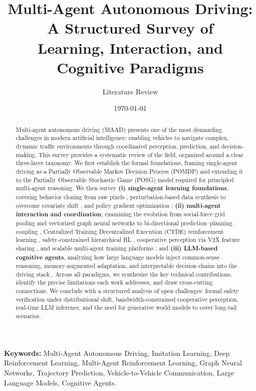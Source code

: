 \documentclass[12pt, a4paper]{article}
\title{\textbf{Multi-Agent Autonomous Driving: A Structured Survey of\\
Learning, Interaction, and Cognitive Paradigms}}
\author{\large Literature Review}
\date{\today}
\begin{document}
\maketitle

\begin{abstract}
Multi-agent autonomous driving (MAAD) presents one of the most demanding
challenges in modern artificial intelligence: enabling vehicles to navigate complex,
dynamic traffic environments through coordinated perception, prediction, and
decision-making. This survey provides a systematic review of the field, organized
around a clear three-layer taxonomy. We first establish the formal foundations,
framing single-agent driving as a Partially Observable Markov Decision Process
(POMDP) and extending it to the Partially Observable Stochastic Game (POSG)
model required for principled multi-agent reasoning. We then survey
\textbf{(i) single-agent learning foundations}, covering behavior cloning from raw
pixels \citep{bojarski2016end}, perturbation-based data synthesis to overcome
covariate shift \citep{bansal2018chauffeur}, and policy gradient optimization
\citep{schulman2017proximal}; \textbf{(ii) multi-agent interaction and coordination},
examining the evolution from social-force grid pooling \citep{alahi2016social} and
vectorized graph neural networks \citep{gao2020vectornet} to bi-directional
prediction--planning coupling \citep{song2020pip}, Centralized Training
Decentralized Execution (CTDE) reinforcement learning \citep{lowe2017multi},
safety-constrained hierarchical RL \citep{shalev2016safe}, cooperative
perception via V2X feature sharing \citep{wang2020v2vnet}, and scalable
multi-agent training platforms \citep{palanisamy2020multi, zhou2020smarts}; and
\textbf{(iii) LLM-based cognitive agents}, analyzing how large language models
inject common-sense reasoning, memory-augmented adaptation, and interpretable
decision chains into the driving stack
\citep{fu2023drive, wen2023dilu, mao2023gpt, sha2023languagempc}.
Across all paradigms, we synthesize the key technical contributions, identify the
precise limitations each work addresses, and draw cross-cutting connections.
We conclude with a structured analysis of open challenges: formal safety
verification under distributional shift, bandwidth-constrained cooperative
perception, real-time LLM inference, and the need for generative world models
to cover long-tail scenarios.
\end{abstract}

\noindent\textbf{Keywords:} Multi-Agent Autonomous Driving, Imitation Learning,
Deep Reinforcement Learning, Multi-Agent Reinforcement Learning, Graph Neural
Networks, Trajectory Prediction, Vehicle-to-Vehicle Communication,
Large Language Models, Cognitive Agents.
\end{document}
